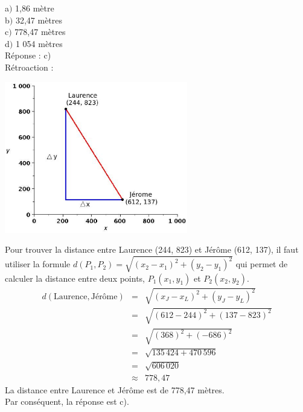 \documentclass[letterpaper, 12pt]{article}
\begin{document}
a$)$ 1,86 m\`etre\\
b$)$ 32,47 m\`etres\\
c$)$ 778,47 m\`etres\\
d$)$ 1 054 m\`etres\\

R\'eponse : c)\\

R\'etroaction :\\
\begin{center}
 \includegraphics[width=8cm,bb=14 14 581 482]{Q2452r.eps}
\end{center}
Pour trouver la distance entre Laurence (244, 823) et J\'er\^ome (612, 137), il faut utiliser la formule $d(P_{1}, P_{2})=\sqrt{(x_{2}-x_{1})^{2}+(y_{2}-y_{1})^{2}}$ qui permet de calculer la distance entre deux points, $P_{1}(x_{1},y_{1})$ et $P_{2}(x_{2},y_{2})$.
\begin{eqnarray*}
 d(\textrm{Laurence}, \textrm{J\'er\^ome})&=&\sqrt{(x_{J}-x_{L})^{2}+(y_{J}-y_{L})^{2}}\\
&=&\sqrt{(612-244)^{2}+(137-823)^{2}}\\
&=&\sqrt{(368)^{2}+(-686)^{2}}\\
&=&\sqrt{135\,424+470\,596}\\
&=&\sqrt{606\,020}\\
&\approx&778,47
\end{eqnarray*}
La distance entre Laurence et J\'er\^ome est de 778,47 m\`etres.\\
Par cons\'equent, la r\'eponse est c).\\
\end{document}
